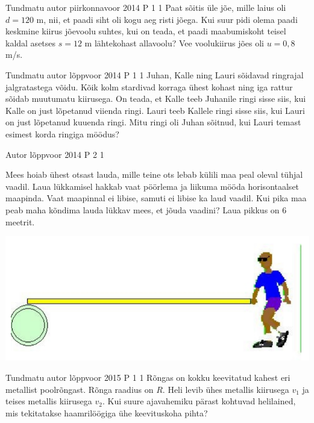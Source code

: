\documentclass[11pt]{article}
\begin{document}
{%
{Tundmatu autor} %
{piirkonnavoor} %
{2014} %
{P 1} %
{1} %
{
\ifStatement
Paat sõitis üle jõe, mille laius oli $d = 120$ m, nii, et paadi siht oli kogu aeg risti jõega. Kui suur pidi olema paadi keskmine kiirus jõevoolu suhtes, kui on teada, et paadi maabumiskoht teisel kaldal asetses $s = 12$ m lähtekohast allavoolu? Vee voolukiirus jões oli $u = 0,8$ m/s.
\fi
}

{Tundmatu autor} %
{lõppvoor} %
{2014} %
{P 1} %
{1} %
{
\ifStatement
Juhan, Kalle ning Lauri sõidavad ringrajal jalgratastega võidu. Kõik kolm stardivad korraga ühest kohast ning iga rattur sõidab muutumatu kiirusega. On teada, et Kalle teeb Juhanile ringi sisse siis, kui Kalle on just lõpetanud viienda ringi. Lauri teeb Kallele ringi sisse siis, kui Lauri on just lõpetanud kuuenda ringi. Mitu ringi oli Juhan sõitnud, kui Lauri temast esimest korda ringiga möödus?
\fi
}



{Autor} %
{lõppvoor} %
{2014} %
{P 2} %
{1} %
{
\ifStatement
 Mees hoiab ühest otsast lauda, mille teine ots lebab külili maa peal oleval tühjal vaadil. Laua lükkamisel hakkab vaat pöörlema ja liikuma mööda horisontaalset maapinda. Vaat maapinnal ei libise, samuti ei libise ka laud vaadil. Kui pika maa peab maha kõndima lauda lükkav mees, et jõuda vaadini? Laua pikkus on $6$ meetrit.
\begin{center}
	\includegraphics[width=0.5\linewidth]{2014-v3p-02-yl.PNG}
\end{center}
\fi
}


{Tundmatu autor} %
{lõppvoor} %
{2015} %
{P 1} %
{1} %
{
\ifStatement
Rõngas on kokku keevitatud kahest eri metallist poolrõngast. Rõnga raadius on $R$. Heli levib ühes metallis kiirusega $v_1$ ja teises metallis kiirusega $v_2$. Kui suure ajavahemiku pärast kohtuvad helilained, mis tekitatakse haamrilöögiga ühe keevituskoha pihta?
\fi
}

}
\end{document}
